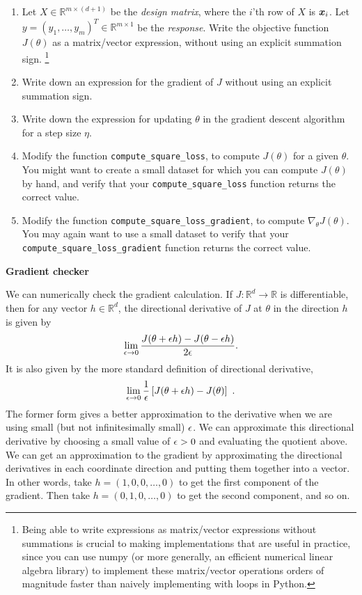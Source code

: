 \documentclass{article}
\newcommand{\nyuparagrah}[1]{\textcolor{nyupurple}{\large #1}}
\begin{document}
\begin{enumerate}
  \setcounter{enumi}{\value{saveenum}}
\item Let $X\in\mathbb{R}^{m\times\left(d+1\right)}$ be the \emph{design matrix}, where the $i$'th row of $X$ is $\boldsymbol{x}_{i}$. Let $y=\left(y_{1},\ldots,y_{m}\right)^{T}\in\mathbb{R}^{m\times1}$
be the \emph{response}. Write the objective function $J(\theta)$ as
a matrix/vector expression, without using an explicit summation sign.
\footnote{Being able to write expressions as matrix/vector expressions without
summations is crucial to making implementations that are useful in
practice, since you can use numpy (or more generally, an efficient
numerical linear algebra library) to implement these matrix/vector
operations orders of magnitude faster than naively implementing with
loops in Python.} 

\item Write down an expression for the gradient of $J$ without using an explicit summation sign. 

\item Write down the expression for updating $\theta$ in the gradient descent
algorithm for a step size $\eta$.

\item Modify the function \texttt{compute\_square\_loss}, to compute $J(\theta)$
for a given $\theta$. You might want to create a small dataset for
which you can compute $J(\theta)$ by hand, and verify that your \texttt{compute\_square\_loss}
function returns the correct value.

\item Modify the function \texttt{compute\_square\_loss\_gradient}, to compute
$\nabla_{\theta}J(\theta)$. You may again want to use a small dataset
to verify that your \texttt{compute\_square\_loss\_gradient} function
returns the correct value.
\setcounter{saveenum}{\value{enumi}}
\end{enumerate}

\nyuparagrah{\bf Gradient checker}

We can numerically check the
gradient calculation. If $J:\mathbb{R}^{d}\to\mathbb{R}$ is differentiable,
then for any vector $h\in\mathbb{R}^{d}$, the directional derivative
of $J$ at $\theta$ in the direction $h$ is given by
\[
\lim_{{\epsilon}\to0}\frac{J(\theta+{\epsilon} h)-J(\theta-{\epsilon} h)}{2{\epsilon}}.
\]
It is also given by the more standard definition of directional
derivative, $$\lim_{{\epsilon}\to0}\frac{1}{{\epsilon}}\left[J(\theta+{\epsilon} h)-J(\theta)\right] \ .$$
The former form gives a better approximation to the derivative when
we are using small (but not infinitesimally small) ${\epsilon}$. We can approximate this directional derivative by choosing a small
value of ${\epsilon}>0$ and evaluating the quotient above. We can get an
approximation to the gradient by approximating the directional derivatives
in each coordinate direction and putting them together into a vector.
In other words, take $h=\left(1,0,0,\ldots,0\right)$ to get the first
component of the gradient. Then take $h=(0,1,0,\ldots,0)$ to get
the second component, and so on. 
\end{document}
